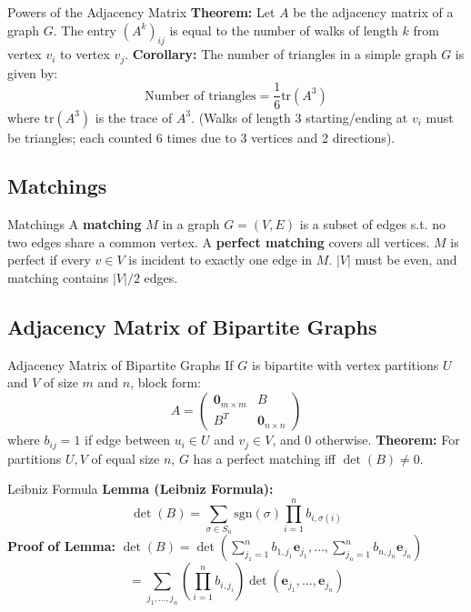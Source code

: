 \documentclass{beamer}
\begin{document}
\begin{frame}{Powers of the Adjacency Matrix}
    \textbf{Theorem:} Let $A$ be the adjacency matrix of a graph $G$. The entry $(A^k)_{ij}$ is equal to the number of walks of length $k$ from vertex $v_i$ to vertex $v_j$.
    \vfill
    \textbf{Corollary:} The number of triangles in a simple graph $G$ is given by:
    \[ \text{Number of triangles} = \frac{1}{6} \text{tr}(A^3) \]
    where $\text{tr}(A^3)$ is the trace of $A^3$. (Walks of length 3 starting/ending at $v_i$ must be triangles; each counted 6 times due to 3 vertices and 2 directions).
\end{frame}
\begin{frame}{}
\end{frame}
\subsection{Matchings}
\begin{frame}{Matchings}
    A \textbf{matching} $M$ in a graph $G = (V, E)$ is a subset of edges s.t. no two edges share a common vertex.
    \vfill
    A \textbf{perfect matching} covers all vertices. $M$ is perfect if every $v \in V$ is incident to exactly one edge in $M$. $|V|$ must be even, and matching contains $|V|/2$ edges.
\end{frame}

\subsection{Adjacency Matrix of Bipartite Graphs}
\begin{frame}{Adjacency Matrix of Bipartite Graphs}
    If $G$ is bipartite with vertex partitions $U$ and $V$ of size $m$ and $n$, block form:
    \[A = \begin{pmatrix} \mathbf{0}_{m \times m} & B \\ B^T & \mathbf{0}_{n \times n} \end{pmatrix}\]
    where $b_{ij} = 1$ if edge between $u_i \in U$ and $v_j \in V$, and $0$ otherwise.
    \vfill
    \textbf{Theorem:} For partitions $U, V$ of equal size $n$, $G$ has a perfect matching iff $\det(B) \neq 0$.
\end{frame}

\begin{frame}{Leibniz Formula}
    \textbf{Lemma (Leibniz Formula):}
    \[\det(B) = \sum_{\sigma \in S_n} \text{sgn}(\sigma) \prod_{i=1}^n b_{i, \sigma(i)}\]
    \vfill
    \textbf{Proof of Lemma:}
    $\det(B) = \det\left(\sum_{j_1=1}^n b_{1,j_1} \mathbf{e}_{j_1}, \dots, \sum_{j_n=1}^n b_{n,j_n} \mathbf{e}_{j_n}\right)$
    \[ = \sum_{j_1, \dots, j_n} \left( \prod_{i=1}^n b_{i,j_i} \right) \det(\mathbf{e}_{j_1}, \dots, \mathbf{e}_{j_n}) \]
\end{frame}
\begin{frame}{}
\end{frame}
\end{document}
